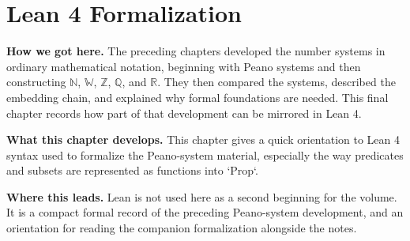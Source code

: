 \chapter{Lean 4 Formalization}
\label{ch:lean}



\begin{tcolorbox}[
  colback=gray!6,
  colframe=gray!40,
  arc=2pt,
  left=8pt, right=8pt, top=6pt, bottom=6pt,
  title={\small\textbf{Structural Roadmap}},
  fonttitle=\small\bfseries
]
\noindent\textbf{How we got here.}
The preceding chapters developed the number systems in ordinary mathematical
notation, beginning with Peano systems and then constructing
$\mathbb{N}$, $\mathbb{W}$, $\mathbb{Z}$, $\mathbb{Q}$, and $\mathbb{R}$.
They then compared the systems, described the embedding chain, and explained
why formal foundations are needed. This final chapter records how part of
that development can be mirrored in Lean 4.

\medskip
\noindent\textbf{What this chapter develops.}
This chapter gives a quick orientation to Lean 4 syntax used to formalize the
Peano-system material, especially the way predicates and subsets are
represented as functions into `Prop`.

\medskip
\noindent\textbf{Where this leads.}
Lean is not used here as a second beginning for the volume. It is a compact
formal record of the preceding Peano-system development, and an orientation
for reading the companion formalization alongside the notes.
\end{tcolorbox}


